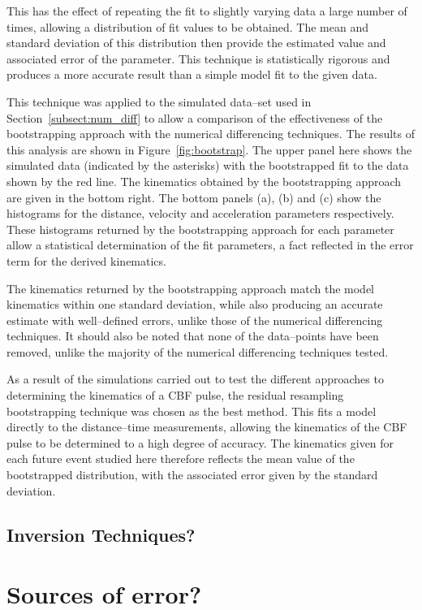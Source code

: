 \documentclass[structabstract]{aa}
\begin{document}
This has the effect of repeating the fit to slightly varying data a large number of times, allowing a distribution of fit values to be obtained. The mean and standard deviation of this distribution then provide the estimated value and associated error of the parameter. This technique is statistically rigorous and produces a more accurate result than a simple model fit to the given data. 

This technique was applied to the simulated data--set used in Section~\ref{subsect:num_diff} to allow a comparison of the effectiveness of the bootstrapping approach with the numerical differencing techniques. The results of this analysis are shown in Figure~\ref{fig:bootstrap}. The upper panel here shows the simulated data (indicated by the asterisks) with the bootstrapped fit to the data shown by the red line. The kinematics obtained by the bootstrapping approach are given in the bottom right. The bottom panels (a), (b) and (c) show the histograms for the distance, velocity and acceleration parameters respectively. These histograms returned by the bootstrapping approach for each parameter allow a statistical determination of the fit parameters, a fact reflected in the error term for the derived kinematics. 

The kinematics returned by the bootstrapping approach match the model kinematics within one standard deviation, while also producing an accurate estimate with well--defined errors, unlike those of the numerical differencing techniques. It should also be noted that none of the data--points have been removed, unlike the majority of the numerical differencing techniques tested. 

As a result of the simulations carried out to test the different approaches to determining the kinematics of a CBF pulse, the residual resampling bootstrapping technique was chosen as the best method. This fits a model directly to the distance--time measurements, allowing the kinematics of the CBF pulse to be determined to a high degree of accuracy. The kinematics given for each future event studied here therefore reflects the mean value of the bootstrapped distribution, with the associated error given by the standard deviation.

\subsection{Inversion Techniques?}
\label{subsect:inversion}

\section{Sources of error?}
\label{sect:error_sources}
\end{document}

